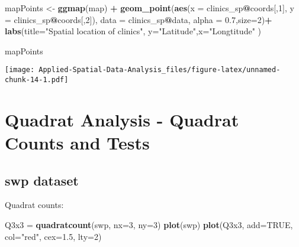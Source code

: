 \documentclass[
]{book}
\newenvironment{Shaded}{\begin{snugshade}}{\end{snugshade}}
\newcommand{\DataTypeTok}[1]{\textcolor[rgb]{0.13,0.29,0.53}{#1}}
\newcommand{\DecValTok}[1]{\textcolor[rgb]{0.00,0.00,0.81}{#1}}
\newcommand{\FloatTok}[1]{\textcolor[rgb]{0.00,0.00,0.81}{#1}}
\newcommand{\KeywordTok}[1]{\textcolor[rgb]{0.13,0.29,0.53}{\textbf{#1}}}
\newcommand{\NormalTok}[1]{#1}
\newcommand{\OperatorTok}[1]{\textcolor[rgb]{0.81,0.36,0.00}{\textbf{#1}}}
\newcommand{\OtherTok}[1]{\textcolor[rgb]{0.56,0.35,0.01}{#1}}
\newcommand{\StringTok}[1]{\textcolor[rgb]{0.31,0.60,0.02}{#1}}
\begin{document}
\begin{Shaded}
\begin{Highlighting}[]
\NormalTok{mapPoints <-}\StringTok{ }\KeywordTok{ggmap}\NormalTok{(map) }\OperatorTok{+}\StringTok{ }
\StringTok{  }\KeywordTok{geom_point}\NormalTok{(}\KeywordTok{aes}\NormalTok{(}\DataTypeTok{x =}\NormalTok{ clinics_sp}\OperatorTok{@}\NormalTok{coords[,}\DecValTok{1}\NormalTok{], }\DataTypeTok{y =}\NormalTok{ clinics_sp}\OperatorTok{@}\NormalTok{coords[,}\DecValTok{2}\NormalTok{]),}
             \DataTypeTok{data =}\NormalTok{ clinics_sp}\OperatorTok{@}\NormalTok{data, }\DataTypeTok{alpha =} \FloatTok{0.7}\NormalTok{,}\DataTypeTok{size=}\DecValTok{2}\NormalTok{)}\OperatorTok{+}\StringTok{ }
\StringTok{  }\KeywordTok{labs}\NormalTok{(}\DataTypeTok{title=}\StringTok{"Spatial location of clinics"}\NormalTok{,}
       \DataTypeTok{y=}\StringTok{"Latitude"}\NormalTok{,}\DataTypeTok{x=}\StringTok{"Longtitude"}\NormalTok{ )}

\NormalTok{mapPoints}
\end{Highlighting}
\end{Shaded}

\texttt{[image: Applied-Spatial-Data-Analysis\_files/figure-latex/unnamed-chunk-14-1.pdf]}

\hypertarget{quadrat-analysis---quadrat-counts-and-tests}{%
\section{Quadrat Analysis - Quadrat Counts and Tests}\label{quadrat-analysis---quadrat-counts-and-tests}}

\hypertarget{swp-dataset}{%
\subsection{swp dataset}\label{swp-dataset}}

Quadrat counts:

\begin{Shaded}
\begin{Highlighting}[]
\NormalTok{Q3x3 =}\StringTok{ }\KeywordTok{quadratcount}\NormalTok{(swp, }\DataTypeTok{nx=}\DecValTok{3}\NormalTok{, }\DataTypeTok{ny=}\DecValTok{3}\NormalTok{)}
\KeywordTok{plot}\NormalTok{(swp)}
\KeywordTok{plot}\NormalTok{(Q3x3, }\DataTypeTok{add=}\OtherTok{TRUE}\NormalTok{, }\DataTypeTok{col=}\StringTok{"red"}\NormalTok{, }\DataTypeTok{cex=}\FloatTok{1.5}\NormalTok{, }\DataTypeTok{lty=}\DecValTok{2}\NormalTok{)}
\end{Highlighting}
\end{Shaded}
\end{document}
